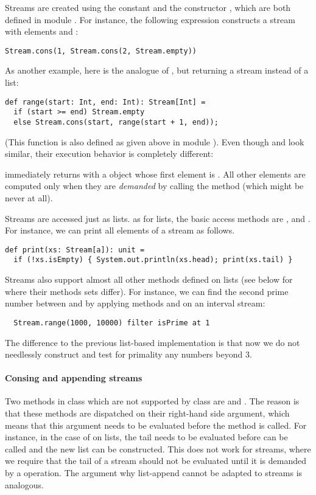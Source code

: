 {Streams are created using the constant  and the constructor ,
which are both defined in module . For instance, the following
expression constructs a stream with elements  and :
\begin{lstlisting}
Stream.cons(1, Stream.cons(2, Stream.empty))
\end{lstlisting}
As another example, here is the analogue of ,
but returning a stream instead of a list:
\begin{lstlisting}
def range(start: Int, end: Int): Stream[Int] = 
  if (start >= end) Stream.empty
  else Stream.cons(start, range(start + 1, end));
\end{lstlisting}
(This function is also defined as given above in module
).  Even though  and 
look similar, their execution behavior is completely different: 

 immediately returns with a  object
whose first element is .  All other elements are computed
only when they are \emph{demanded} by calling the  method
(which might be never at all).  

Streams are accessed just as lists. as for lists, the basic access
methods are ,  and . For instance,
we can print all elements of a stream as follows.
\begin{lstlisting}
def print(xs: Stream[a]): unit = 
  if (!xs.isEmpty) { System.out.println(xs.head); print(xs.tail) }
\end{lstlisting}
Streams also support almost all other methods defined on lists (see
below for where their methods sets differ). For instance, we can find
the second prime number between  and  by applying methods
 and  on an interval stream:
\begin{lstlisting}
  Stream.range(1000, 10000) filter isPrime at 1
\end{lstlisting}
The difference to the previous list-based implementation is that now
we do not needlessly construct and test for primality any numbers
beyond 3.

\paragraph{Consing and appending streams} Two methods in class 
which are not supported by class  are \code{::} and
\code{:::}.  The reason is that these methods are dispatched on their
right-hand side argument, which means that this argument needs to be
evaluated before the method is called. For instance, in the case of
 on lists, the tail  needs to be evaluated
before \code{::} can be called and the new list can be constructed.
This does not work for streams, where we require that the tail of a
stream should not be evaluated until it is demanded by a  operation.
The argument why list-append \code{:::} cannot be adapted to streams is analogous.

}
